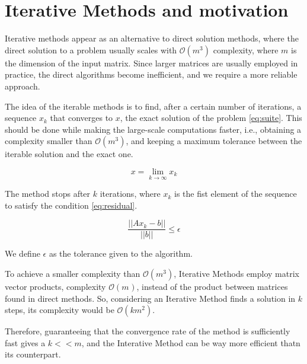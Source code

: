 \section{Iterative Methods and motivation}


Iterative methods appear as an alternative to direct solution methods, where the direct solution to a problem usually scales with $\mathcal{O}(m^{3})$ complexity, where $m$ is the dimension of the input matrix. Since larger matrices are usually employed in practice, the direct algorithms become inefficient, and we require a more reliable approach.


The idea of the iterable methods is to find, after a certain number of iterations, a sequence ${x_{k}}$ that converges to $x$, the exact solution of the problem \ref{eq:suite}. This should be done while making the large-scale computations faster, i.e., obtaining a complexity smaller than $\mathcal{O}(m^{3})$, and keeping a maximum tolerance between the iterable solution and the exact one.


\begin{equation}\label{eq:suite}
    x = \lim_{k \to \infty} x_{k}
\end{equation}


The method stops after $k$ iterations, where $x_{k}$ is the fist element of the sequence to satisfy the condition \ref{eq:residual}.

\begin{equation}\label{eq:residual}
    \frac{||Ax_{k} - b||}{||b||} \leq \epsilon
\end{equation}

We define $\epsilon$ as the tolerance given to the algorithm.

To achieve a smaller complexity than $\mathcal{O}(m^{3})$, Iterative Methods employ matrix vector products, complexity $\mathcal{O}(m^{})$, instead of the product between matrices found in direct methods. So, considering an Iterative Method finds a solution in $k$ steps, its complexity would be $\mathcal{O}(km^{2})$.

Therefore, guaranteeing that the convergence rate of the method is sufficiently fast gives a $k << m$, and the Interative Method can be way more efficient thatn its counterpart.

